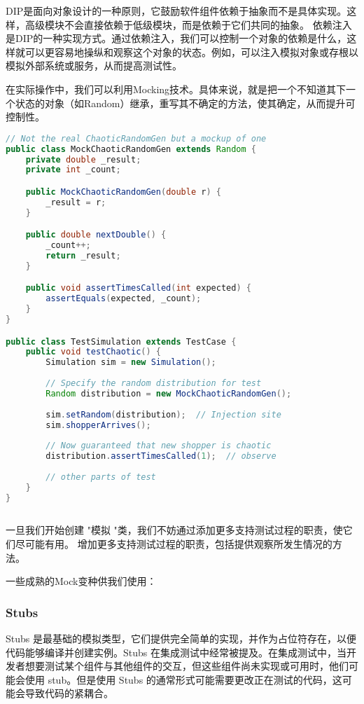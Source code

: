 DIP是面向对象设计的一种原则，它鼓励软件组件依赖于抽象而不是具体实现。这样，高级模块不会直接依赖于低级模块，而是依赖于它们共同的抽象。
依赖注入是DIP的一种实现方式。通过依赖注入，我们可以控制一个对象的依赖是什么，这样就可以更容易地操纵和观察这个对象的状态。例如，可以注入模拟对象或存根以模拟外部系统或服务，从而提高测试性。

在实际操作中，我们可以利用Mocking技术。具体来说，就是把一个不知道其下一个状态的对象（如Random）继承，重写其不确定的方法，使其确定，从而提升可控制性。

\begin{lstlisting}[language=Java, caption=Mocking Example, label=lst:mocking_ex]
// Not the real ChaoticRandomGen but a mockup of one
public class MockChaoticRandomGen extends Random {
    private double _result;
    private int _count;

    public MockChaoticRandomGen(double r) {
        _result = r;
    }

    public double nextDouble() {
        _count++;
        return _result;
    }

    public void assertTimesCalled(int expected) {
        assertEquals(expected, _count);
    }
}

public class TestSimulation extends TestCase {
    public void testChaotic() {
        Simulation sim = new Simulation();
        
        // Specify the random distribution for test
        Random distribution = new MockChaoticRandomGen();
        
        sim.setRandom(distribution);  // Injection site
        sim.shopperArrives();
        
        // Now guaranteed that new shopper is chaotic
        distribution.assertTimesCalled(1);  // observe
        
        // other parts of test
    }
}
	
\end{lstlisting}

一旦我们开始创建 "模拟 "类，我们不妨通过添加更多支持测试过程的职责，使它们尽可能有用。
增加更多支持测试过程的职责，包括提供观察所发生情况的方法。

一些成熟的Mock变种供我们使用：

\subsubsection{Stubs}
Stubs 是最基础的模拟类型，它们提供完全简单的实现，并作为占位符存在，以便代码能够编译并创建实例。Stubs 在集成测试中经常被提及。在集成测试中，当开发者想要测试某个组件与其他组件的交互，但这些组件尚未实现或可用时，他们可能会使用 stub。但是使用 Stubs 的通常形式可能需要更改正在测试的代码，这可能会导致代码的紧耦合。

